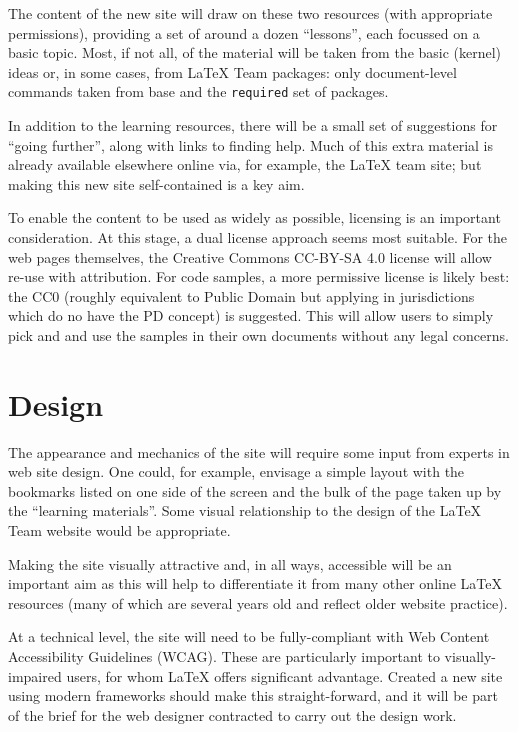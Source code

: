 \documentclass{article}
\begin{document}
The content of the new site will draw on these two resources (with appropriate
permissions), providing a set of around a dozen \enquote{lessons}, each
focussed on a basic topic. Most, if not all, of the material will be taken from
the basic (kernel) ideas or, in some cases, from \LaTeX{} Team packages: only
document-level commands taken from base and the \texttt{required} set of
packages.

In addition to the learning resources, there will be a small set of suggestions
for \enquote{going further}, along with links to finding help. Much of this
extra material is already available elsewhere online via, for example, the
\LaTeX{} team site; but making this new site self-contained is a key aim.

To enable the content to be used as widely as possible, licensing is an
important consideration. At this stage, a dual license approach seems most
suitable. For the web pages themselves, the Creative Commons CC-BY-SA 4.0
license will allow re-use with attribution. For code samples, a more permissive
license is likely best: the CC0 (roughly equivalent to Public Domain but
applying in jurisdictions which do no have the PD concept) is suggested. This
will allow users to simply pick and and use the samples in their own documents
without any legal concerns.

\section{Design}

The appearance and mechanics of the site will require some input from experts
in web site design. One could, for example, envisage a simple layout with the
bookmarks listed on one side of the screen and the bulk of the page taken up by
the \enquote{learning materials}. Some visual relationship to the design of the
\LaTeX{} Team website would be appropriate.

Making the site visually attractive and, in all ways, accessible will be an
important aim as this will help to differentiate it from many other online
\LaTeX{} resources (many of which are several years old and reflect older
website practice).

At a technical level, the site will need to be fully-compliant with Web Content
Accessibility Guidelines (WCAG). These are particularly important to
visually-impaired users, for whom \LaTeX{} offers significant advantage.
Created a new site using modern frameworks should make this straight-forward,
and it will be part of the brief for the web designer contracted to carry out
the design work.
\end{document}
